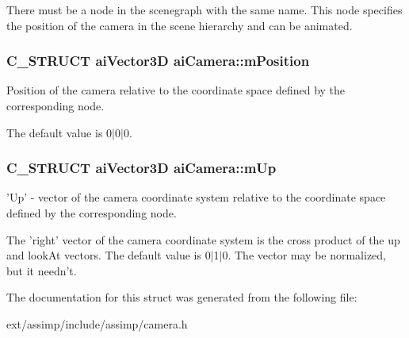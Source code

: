 There must be a node in the scenegraph with the same name. This node specifies the position of the camera in the scene hierarchy and can be animated. \hypertarget{structai_camera_a518617ea192ca0698e748a4399e7c3a5}{
\subsubsection[{m\-Position}]{\setlength{\rightskip}{0pt plus 5cm}C\-\_\-\-S\-T\-R\-U\-C\-T {\bf ai\-Vector3\-D} ai\-Camera\-::m\-Position}}\label{structai_camera_a518617ea192ca0698e748a4399e7c3a5}
Position of the camera relative to the coordinate space defined by the corresponding node.

The default value is 0$\vert$0$\vert$0. \hypertarget{structai_camera_a7fb42b287389b4f99c883098268d6d1a}{
\subsubsection[{m\-Up}]{\setlength{\rightskip}{0pt plus 5cm}C\-\_\-\-S\-T\-R\-U\-C\-T {\bf ai\-Vector3\-D} ai\-Camera\-::m\-Up}}\label{structai_camera_a7fb42b287389b4f99c883098268d6d1a}
'Up' -\/ vector of the camera coordinate system relative to the coordinate space defined by the corresponding node.

The 'right' vector of the camera coordinate system is the cross product of the up and look\-At vectors. The default value is 0$\vert$1$\vert$0. The vector may be normalized, but it needn't. 

The documentation for this struct was generated from the following file\-:\begin{DoxyCompactItemize}
\item 
ext/assimp/include/assimp/camera.\-h\end{DoxyCompactItemize}
